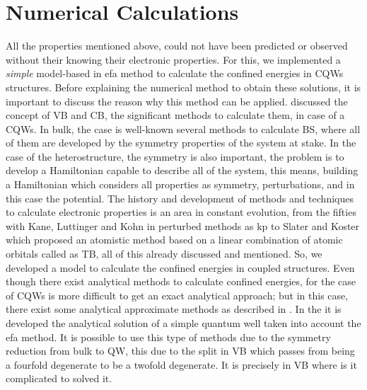 \section{Numerical Calculations}
\label{sec:chapter-2-numerical-calculations}
\vspace{-10mm} 
All the properties mentioned above, could not have been predicted or observed without their knowing their electronic properties. For this, we implemented a \emph{simple} model-based in \gls{efa} method to calculate the confined energies in \gls{CQWs} structures. Before explaining the numerical method to obtain these solutions, it is important to discuss the reason why this method can be applied.   discussed  the concept of \gls{VB} and \gls{CB},  the significant methods to calculate them, in case of a  \gls{CQWs}. In bulk, the case is well-known several methods to calculate \gls{BS}, where all of them are developed by the symmetry properties of the system at stake. In the case of the heterostructure, the symmetry is also important, the problem is to develop a Hamiltonian capable to describe all of the system, this means, building a Hamiltonian which considers all properties as symmetry, perturbations, and in this case the potential. 
The history and development of methods and techniques to calculate electronic properties is an area in constant evolution, from the fifties with Kane\cite{kane1957bandstructure}, Luttinger and Kohn\cite{Luttinger1955motion} in perturbed methods as \gls{kp} to Slater and Koster\cite{slater1954simplified} which proposed an atomistic method based on a linear combination of atomic orbitals called as \gls{TB}, all of this already discussed and mentioned. So, we developed a model to calculate the confined energies in coupled structures. Even though there exist analytical methods to calculate confined energies, for the case of \gls{CQWs} is more difficult to get an exact analytical  approach; but in this case, there exist some analytical approximate methods as described in \cite{yariv1985approximate,fromherz1997floquet,rosencher2002optoelectronics}.
In the  it is developed the analytical solution of a simple quantum well taken into account the \gls{efa} method. It is possible to use this type of methods due to the symmetry reduction from bulk to QW, this due to the split in \gls{VB} which passes from being a fourfold degenerate to be a twofold degenerate. It is precisely in \gls{VB} where is it complicated to solved it. 


